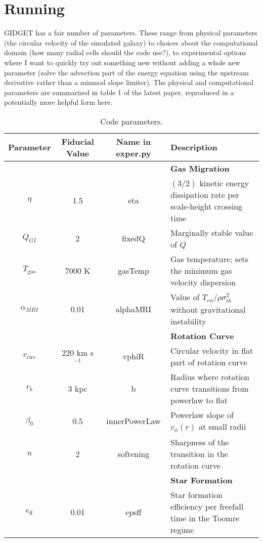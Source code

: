 \documentclass[11pt]{amsart}
\begin{document}
\section{Running}

GIDGET has a fair number of parameters. These range from physical parameters (the circular velocity of the simulated galaxy) to choices about the computational domain (how many radial cells should the code use?), to experimental options where I want to quickly try out something new without adding a whole new parameter (solve the advection part of the energy equation using the upstream derivative rather than a minmod slope limiter). The physical and computational parameters are summarized in table 1 of the latest paper, reproduced in a potentially more helpful form here.

\begin{table}
        \caption{Code parameters.}
        \label{ta:params}
        \resizebox{17cm}{!} { \footnotesize
        \begin{tabular}{cccl}
        \hline
        Parameter & Fiducial Value & Name in exper.py & Description \\  
        \hline
        & & & {\bf Gas Migration}  \\
        $\eta$ & 1.5 & eta & $(3/2)$ kinetic energy dissipation rate per scale-height crossing time \\
        $Q_{GI}$ & 2 & fixedQ & Marginally stable value of $Q$ \\
        $T_\mathrm{gas}$ & 7000 K & gasTemp & Gas temperature; sets the minimum gas velocity dispersion \\ 
        $\alpha_{MRI}$ & 0.01 & alphaMRI & Value of $T_{r\phi}/\rho\sigma_{th}^2$ without gravitational instability \\ \hline
        & & & {\bf Rotation Curve}  \\
        $v_\mathrm{circ}$ & 220 km s$^{-1}$ & vphiR & Circular velocity in flat part of rotation curve\\
        $r_b$ & 3 kpc & b & Radius where rotation curve transitions from powerlaw to flat \\
        $\beta_0$ & 0.5 & innerPowerLaw & Powerlaw slope of $v_\phi(r)$ at small radii \\
        $n$ & 2 & softening & Sharpness of the transition in the rotation curve \\ \hline
        & & & {\bf Star Formation} \\
        $\epsilon_\mathrm{ff}$ & 0.01 & epsff & Star formation efficiency per freefall time in the Toomre regime \\

\end{tabular}}
\end{table}
\end{document}
